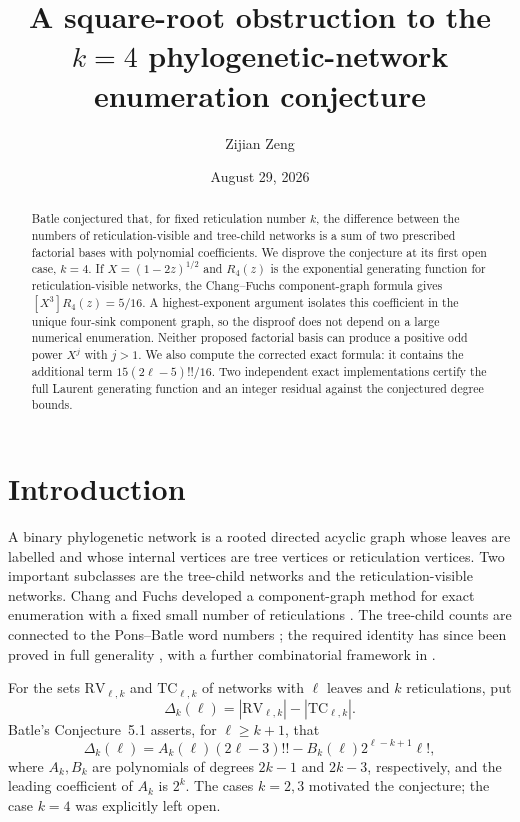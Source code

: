 \documentclass[11pt]{amsart}
\title[The $k=4$ phylogenetic-network conjecture is false]
{A square-root obstruction to the $k=4$ phylogenetic-network enumeration conjecture}
\author{Zijian Zeng}
\date{August 29, 2026}
\theoremstyle{definition}
\newcommand{\RV}{\mathrm{RV}}
\newcommand{\TC}{\mathrm{TC}}
\begin{document}
\begin{abstract}
Batle conjectured that, for fixed reticulation number $k$, the difference
between the numbers of reticulation-visible and tree-child networks is a sum
of two prescribed factorial bases with polynomial coefficients.  We disprove
the conjecture at its first open case, $k=4$.  If
$X=(1-2z)^{1/2}$ and $R_4(z)$ is the exponential generating function for
reticulation-visible networks, the Chang--Fuchs component-graph formula gives
$[X^3]R_4(z)=5/16$.  A highest-exponent argument isolates this coefficient in
the unique four-sink component graph, so the disproof does not depend on a
large numerical enumeration.  Neither proposed factorial basis can produce
a positive odd power $X^j$ with $j>1$.  We also compute the corrected exact
formula: it contains the additional term $15(2\ell-5)!!/16$.  Two independent
exact implementations certify the full Laurent generating function and an
integer residual against the conjectured degree bounds.
\end{abstract}

\maketitle

\section{Introduction}

A binary phylogenetic network is a rooted directed acyclic graph whose leaves
are labelled and whose internal vertices are tree vertices or reticulation
vertices.  Two important subclasses are the tree-child networks and the
reticulation-visible networks.  Chang and Fuchs developed a component-graph
method for exact enumeration with a fixed small number of reticulations
\cite{ChangFuchs2024}.  The tree-child counts are connected to the
Pons--Batle word numbers \cite{PonsBatle2021}; the required identity has since
been proved in full generality \cite{LinEtAl2026}, with a further combinatorial
framework in \cite{LiuWallnerYu2026}.

For the sets $\RV_{\ell,k}$ and $\TC_{\ell,k}$ of networks with $\ell$ leaves
and $k$ reticulations, put
\[
 \Delta_k(\ell)=|\RV_{\ell,k}|-|\TC_{\ell,k}|.
\]
Batle's Conjecture~5.1 \cite{Batle2026} asserts, for $\ell\ge k+1$, that
\begin{equation}\label{eq:conjecture}
 \Delta_k(\ell)=A_k(\ell)(2\ell-3)!!
 -B_k(\ell)2^{\ell-k+1}\ell!,
\end{equation}
where $A_k,B_k$ are polynomials of degrees $2k-1$ and $2k-3$, respectively,
and the leading coefficient of $A_k$ is $2^k$.  The cases $k=2,3$ motivated
the conjecture; the case $k=4$ was explicitly left open.
\end{document}
